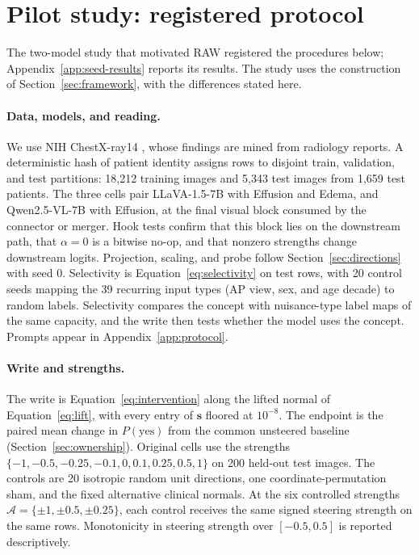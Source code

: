 \section{Pilot study: registered protocol}
\label{app:seed}

The two-model study that motivated RAW registered the procedures below; Appendix~\ref{app:seed-results} reports its results. The study uses the construction of Section~\ref{sec:framework}, with the differences stated here.

\paragraph{Data, models, and reading.}
We use NIH ChestX-ray14 \citep{wang2017chestxray}, whose findings are mined from radiology reports. A deterministic hash of patient identity assigns rows to disjoint train, validation, and test partitions: 18,212 training images and 5,343 test images from 1,659 test patients. The three cells pair LLaVA-1.5-7B \citep{liu2024improved} with Effusion and Edema, and Qwen2.5-VL-7B \citep{bai2025qwen25vl} with Effusion, at the final visual block consumed by the connector or merger. Hook tests confirm that this block lies on the downstream path, that $\alpha=0$ is a bitwise no-op, and that nonzero strengths change downstream logits. Projection, scaling, and probe follow Section~\ref{sec:directions} with seed 0. Selectivity is Equation~\ref{eq:selectivity} on test rows, with 20 control seeds mapping the 39 recurring input types (AP view, sex, and age decade) to random labels. Selectivity compares the concept with nuisance-type label maps of the same capacity, and the write then tests whether the model uses the concept. Prompts appear in Appendix~\ref{app:protocol}.

\paragraph{Write and strengths.}
The write is Equation~\ref{eq:intervention} along the lifted normal of Equation~\ref{eq:lift}, with every entry of $\boldsymbol s$ floored at $10^{-8}$. The endpoint is the paired mean change in $P(\mathrm{yes})$ from the common unsteered baseline (Section~\ref{sec:ownership}). Original cells use the strengths $\{-1,-0.5,-0.25,-0.1,0,0.1,0.25,0.5,1\}$ on 200 held-out test images. The controls are 20 isotropic random unit directions, one coordinate-permutation sham, and the fixed alternative clinical normals. At the six controlled strengths $\mathcal A=\{\pm1,\pm0.5,\pm0.25\}$, each control receives the same signed steering strength on the same rows. Monotonicity in steering strength over $[-0.5,0.5]$ is reported descriptively.

